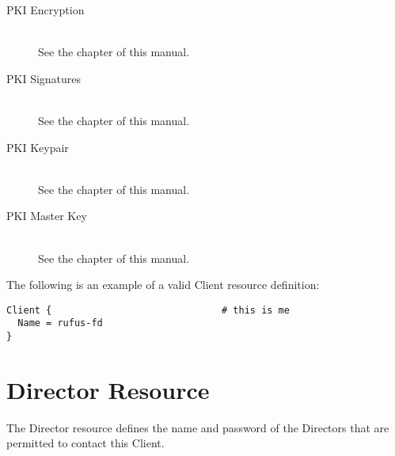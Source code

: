 \begin{description}
\item [PKI Encryption] \hfill \\
See the  chapter of this manual.

\item [PKI Signatures] \hfill \\
See the  chapter of this manual.

\item [PKI Keypair] \hfill \\
See the  chapter of this manual.

\item [PKI Master Key] \hfill \\
See the  chapter of this manual.

\end{description}

The following is an example of a valid Client resource definition:

\footnotesize
\begin{verbatim}
Client {                              # this is me
  Name = rufus-fd
}
\end{verbatim}
\normalsize

\section{Director Resource}
\label{DirectorResource}

The Director resource defines the name and password of the Directors that are
permitted to contact this Client.

